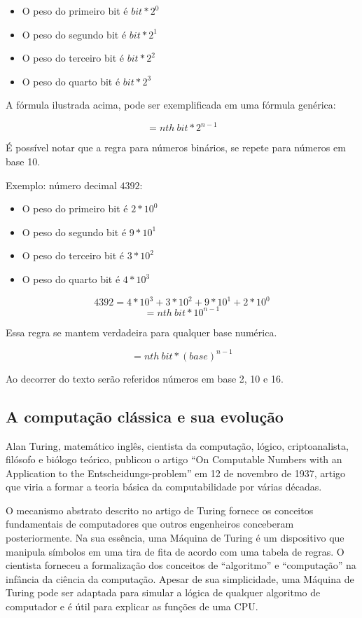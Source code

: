 \begin{itemize}
  \item O peso do primeiro bit é $bit * 2^0$
  \item O peso do segundo bit é $bit * 2^1$
  \item O peso do terceiro bit é $bit * 2^2$
  \item O peso do quarto bit é $bit * 2^3$
\end{itemize}

A fórmula ilustrada acima, pode ser exemplificada em uma fórmula genérica: 

\[= nth\: bit * 2^{n-1}\]

É possível notar que a regra para números binários, se repete para números em base 10.

Exemplo: número decimal $4392$:
\begin{itemize}
  \item O peso do primeiro bit é $2 * 10^0$
  \item O peso do segundo bit é $9 * 10^1$
  \item O peso do terceiro bit é $3 * 10^2$
  \item O peso do quarto bit é $4 * 10^3$
\end{itemize}
\[ 4392 = 4*10^3 + 3*10^2 + 9*10^1 + 2*10^0\]
\[= nth\: bit * 10^{n-1}\]

Essa regra se mantem verdadeira para qualquer base numérica.

\[= nth\: bit * (base)^{n-1}\]

Ao decorrer do texto serão referidos números em base 2, 10 e 16. 

\subsection{A computação clássica e sua evolução}
Alan Turing, matemático inglês, cientista da computação, lógico, criptoanalista, filósofo e biólogo teórico, publicou o artigo ``On Computable Numbers with an Application to the Entscheidungs-problem'' \cite{8} em 12 de novembro de 1937, artigo que viria a formar a teoria básica da computabilidade por várias décadas.

O mecanismo abstrato descrito no artigo de Turing fornece os conceitos fundamentais de computadores que outros engenheiros conceberam posteriormente. Na sua essência, uma Máquina de Turing é um dispositivo que manipula símbolos em uma tira de fita de acordo com uma tabela de regras. O cientista forneceu a formalização dos conceitos de ``algoritmo'' e ``computação'' na infância da ciência da computação. Apesar de sua simplicidade, uma Máquina de Turing pode ser adaptada para simular a lógica de qualquer algoritmo de computador e é útil para explicar as funções de uma CPU.

